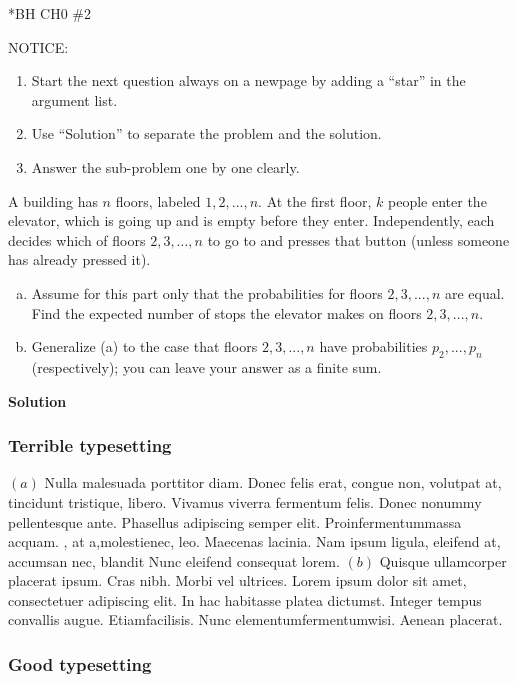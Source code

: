\documentclass{article}
\newcommand{\solution}{\textbf{\Large Solution}}
\begin{document}
\begin{homeworkProblem}*{BH CH0 \#2}

{\color{blue}
NOTICE: 
\begin{enumerate}
	\item 
	Start the next question always on a newpage by adding a ``star'' in the argument list.
	\item
	Use ``Solution'' to separate the problem and the solution.
	\item
	Answer the sub-problem one by one clearly.
\end{enumerate}}

A building has $n$ floors, labeled $1, 2, . . . , n$.
At the first floor, $k$ people enter the elevator, which is going up and is empty before they enter.
Independently, each decides which of floors $2, 3, . . . , n$ to go to and presses that button (unless someone has already pressed it).
\begin{enumerate}[(a)]
	\item
	Assume for this part only that the probabilities for floors $2, 3, . . . , n$ are equal.
	Find the expected number of stops the elevator makes on floors $2, 3, . . . , n$.
	
	\item
	Generalize (a) to the case that floors $2, 3, . . . , n$ have probabilities $p_2, . . . , p_n$ (respectively);
	you can leave your answer as a finite sum.
\end{enumerate}

\solution

\subsubsection{Terrible typesetting}

$(a)$ Nulla malesuada porttitor diam. Donec felis erat, congue non, volutpat at, tincidunt tristique, libero. Vivamus viverra fermentum felis. Donec nonummy pellentesque ante. Phasellus adipiscing semper elit. Proinfermentummassa acquam. , at a,molestienec, leo. Maecenas lacinia. Nam ipsum ligula, eleifend at, accumsan nec, blandit Nunc eleifend consequat lorem. $(b)$ Quisque ullamcorper placerat ipsum. Cras nibh. Morbi vel ultrices. Lorem ipsum dolor sit amet, consectetuer adipiscing elit. In hac habitasse platea dictumst. Integer tempus convallis augue. Etiamfacilisis. Nunc elementumfermentumwisi. Aenean placerat.

\subsubsection{Good typesetting}


\end{homeworkProblem}
\end{document}

